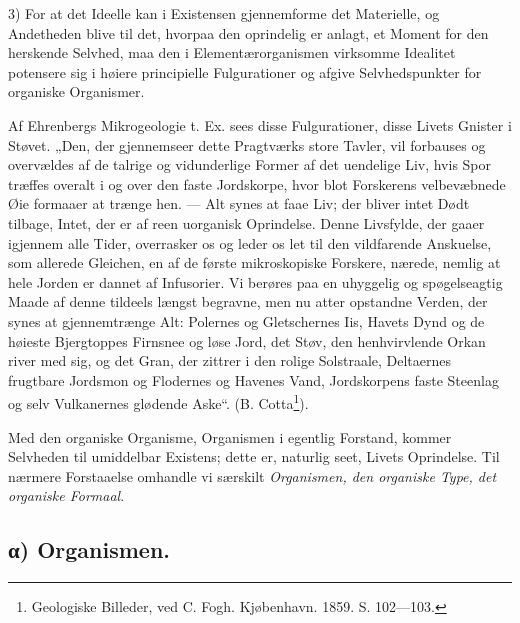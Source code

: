 \documentclass[12pt,a4paper]{book}
\begin{document}
3) For at det Ideelle kan i Existensen gjennemforme det Materielle,
og Andetheden blive til det, hvorpaa den oprindelig er anlagt, et
Moment for den herskende Selvhed,
\setcounter{footnote}{0}
maa den i Elementærorganismen virksomme Idealitet potensere sig i
høiere principielle Fulgurationer og afgive Selvhedspunkter for
organiske Organismer.

Af Ehrenbergs Mikrogeologie t. Ex. sees disse Fulgurationer, disse
Livets Gnister i Støvet. „Den, der gjennemseer dette Pragtværks
store Tavler, vil forbauses og overvældes af de talrige og
vidunderlige Former af det uendelige Liv, hvis Spor træffes overalt
i og over den faste Jordskorpe, hvor blot Forskerens velbevæbnede
Øie formaaer at trænge hen. --- Alt synes at faae Liv; der bliver
intet Dødt tilbage, Intet, der er af reen uorganisk Oprindelse.
Denne Livsfylde, der gaaer igjennem alle Tider, overrasker os og
leder os let til den vildfarende Anskuelse, som allerede Gleichen,
en af de første mikroskopiske Forskere, nærede, nemlig at hele
Jorden er dannet af Infusorier. Vi berøres paa en uhyggelig og
spøgelseagtig Maade af denne tildeels længst begravne, men nu atter
opstandne Verden, der synes at gjennemtrænge Alt: Polernes og
Gletschernes Iis, Havets Dynd og de høieste Bjergtoppes Firnsnee og
løse Jord, det Støv, den henhvirvlende Orkan river med sig, og det
Gran, der zittrer i den rolige Solstraale, Deltaernes frugtbare
Jordsmon og Flodernes og Havenes Vand, Jordskorpens faste Steenlag
og selv Vulkanernes glødende Aske“. (B. Cotta\footnote{Geologiske
Billeder, ved C. Fogh. Kjøbenhavn. 1859. S. 102---103.}).

Med den organiske Organisme, Organismen i egentlig Forstand, kommer
Selvheden til umiddelbar Existens; dette er, naturlig seet, Livets
Oprindelse. Til nærmere Forstaaelse omhandle vi særskilt
\emph{Organismen, den organiske Type, det organiske Formaal}.

\subsection*{α) Organismen.}
\end{document}
